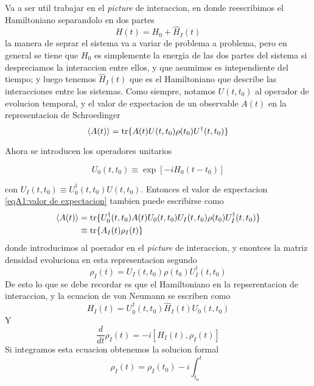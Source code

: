 Va a ser util trabajar en el \textit{picture} de interaccion, en donde reescribimos el Hamiltoniano separandolo en dos partes
\begin{equation}
    H(t)=H_0+\hat H_I(t)
\end{equation}
la manera de seprar el sistema va a variar de problema a problema, pero en general se tiene que $H_0$ es simplemente la energia de las dos partes del sistema si despreciamos la interaccion entre ellos, y que asumimos es intependiente del tiempo; y luego tenemos $\hat H_I(t)$ que es el Hamiltoniano que describe las interacciones entre los sistemas. Como siempre, notamos $U(t,t_0)$ al operador de evolucion temporal, y el valor de expectacion de un observable $A(t)$ en la representacion de Schroedinger
\begin{equation}
    \langle A(t) \rangle = \tr \{ A(t)U(t,t_0) \rho(t_0)U^\dagger(t,t_0) \}
    \label{ecA1:valor de expectacion}
\end{equation}

Ahora se introducen los operadores unitarios

\begin{equation}
    U_0(t,t_0)\equiv\exp [ -i H_0(t-t_0)]
\end{equation}

con $U_I(t,t_0)\equiv U_0^\dagger(t,t_0)U(t,t_0)$. Entonces el valor de expectacion \ref{eqA1:valor de expectacion} tambien puede escribirse como
\begin{equation}
    \begin{aligned}
    \langle A(t) \rangle &= \tr \{ U_0^\dagger(t,t_0)A(t)U_0(t,t_0)U_I(t,t_0) \rho(t_0)U_I^\dagger(t,t_0) \} \\
    & \equiv \tr \{A_I(t)\rho_I(t) \}
    \end{aligned}
    \label{ecA1:valor de expectacion interaccion}
\end{equation}
donde introducimos al poerador en el \textit{picture} de interaccion, y enontces la matriz densidad evoluciona en esta representacion segundo
\begin{equation}
    \rho_I(t)=U_I(t,t_0)\rho(t_0)U^\dagger_I(t,t_0)
\end{equation}
De esto lo que se debe recordar es que el Hamiltoniano en la repserentacion de interaccion, y la ecuacion de von Neumann se escriben como
\begin{equation}
    H_I(t)=U_0^\dagger(t,t_0)\hat H_I(t)U_0(t,t_0)
\end{equation}
Y
\begin{equation}
    \frac{d}{dt}\rho_I(t)=-i[H_I(t),\rho_I(t)]
\end{equation}
Si integramos esta ecuacion obtenemos la solucion formal
\begin{equation}
    \rho_I(t)=\rho_I(t_0)-i\int_{t_0}^{t}
\end{equation}

